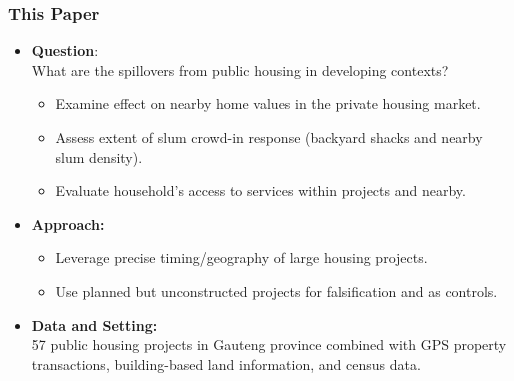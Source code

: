 \documentclass[aspectratio=149]{beamer}
\begin{document}
\begin{frame}
\frametitle{This Paper}

\centering

\begin{itemize}
  \item<1-> \textbf{Question}: \\ 
  \vspace{.2cm}
  {What are the spillovers from public housing in developing contexts?}
  \vspace{.2cm}
    \begin{itemize}
      \item<2-> Examine effect on nearby home values in the private housing market. 
      \vspace{1mm}
      \item<3-> Assess extent of slum crowd-in response (backyard shacks and nearby slum density).
      \vspace{1mm}
      \item<4-> Evaluate household's access to services within projects and nearby.
    \end{itemize}
\vspace{.2cm}
\item<5-> \textbf{Approach:} 
\vspace{1mm}
\begin{itemize}
      \item Leverage precise timing/geography of large housing projects.
      \vspace{1mm}
      \item Use planned but unconstructed projects for falsification and as controls.
    \end{itemize}
\vspace{.2cm}
\item<6-> \textbf{Data and Setting:} \\
\vspace{.1cm} 
{\small 57 public housing projects in Gauteng province combined with GPS property transactions, building-based land information, and census data.}
\end{itemize}

\end{frame}

\end{document}
